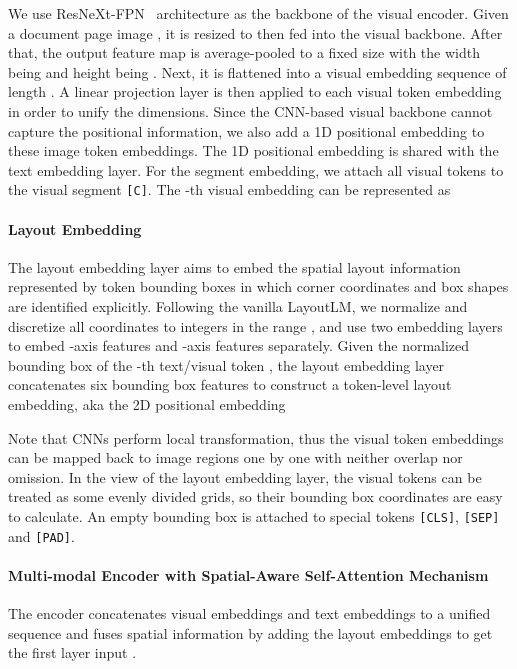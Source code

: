 \documentclass{article} \usepackage{iclr2021_conference,times}
\begin{document}
We use ResNeXt-FPN~\citep{Xie2016AggregatedRT,Lin_2017_CVPR} architecture as the backbone of the visual encoder. Given a document page image , it is resized to  then fed into the visual backbone.
After that, the output feature map is average-pooled to a fixed size with the width being  and height being . Next, it is flattened into a visual embedding sequence of length .
A linear projection layer is then applied to each visual token embedding in order to unify the dimensions.
Since the CNN-based visual backbone cannot capture the positional information, we also add a 1D positional embedding to these image token embeddings. The 1D positional embedding is shared with the text embedding layer.
For the segment embedding, we attach all visual tokens to the visual segment {\tt[C]}.
The -th visual embedding can be represented as



\paragraph{Layout Embedding}

The layout embedding layer aims to embed the spatial layout information represented by token bounding boxes in which corner coordinates and box shapes are identified explicitly. Following the vanilla LayoutLM, we normalize and discretize all coordinates to integers in the range , and use two embedding layers to embed -axis features and -axis features separately. Given the normalized bounding box of the -th text/visual token , the layout embedding layer concatenates six bounding box features to construct a token-level layout embedding, aka the 2D positional embedding

Note that CNNs perform local transformation, thus the visual token embeddings can be mapped back to image regions one by one with neither overlap nor omission. In the view of the layout embedding layer, the visual tokens can be treated as some evenly divided grids, so their bounding box coordinates are easy to calculate. An empty bounding box  is attached to special tokens {\tt[CLS]}, {\tt[SEP]} and {\tt[PAD]}.

\paragraph{Multi-modal Encoder with Spatial-Aware Self-Attention Mechanism}
The encoder concatenates visual embeddings  and text embeddings  to a unified sequence  and fuses spatial information by adding the layout embeddings to get the first layer input .
\end{document}
